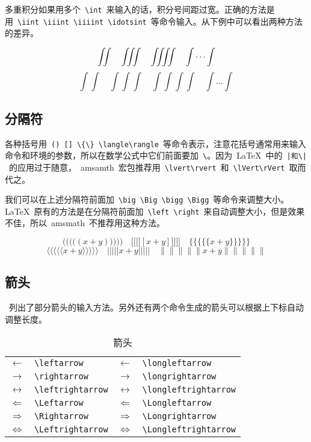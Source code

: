 多重积分如果用多个~\verb|\int|~来输入的话，积分号间距过宽。正确的方法是用~\verb|\iint \iiint \iiiint \idotsint|~等命令输入。从下例中可以看出两种方法的差异。

\begin{out}
\[\iint\quad \iiint\quad \iiiint\quad \idotsint\]
\[\int\int\quad \int\int\int\quad \int\int\int\int\quad \int\dots\int\]
\end{out}

\subsection{分隔符}
各种括号用~\verb|() [] \{\} \langle\rangle|~等命令表示，注意花括号通常用来输入命令和环境的参数，所以在数学公式中它们前面要加~\verb|\|。因为~\LaTeX~中的~\verb+|和\|+~的应用过于随意，~amsamth~宏包推荐用~\verb|\lvert\rvert|~和~\verb|\lVert\rVert|~取而代之。

我们可以在上述分隔符前面加~\verb|\big \Big \bigg \Bigg|~等命令来调整大小。\LaTeX~原有的方法是在分隔符前面加~\verb|\left \right|~来自动调整大小，但是效果不佳，所以~amsmath~不推荐用这种方法。

\begin{out}
\[\Bigg(\bigg(\Big(\big((x+y)\big)\Big)\bigg)\Bigg)\quad 
\Bigg[\bigg[\Big[\big[[x+y]\big]\Big]\bigg]\Bigg]\quad 
\Bigg\{\bigg\{\Big\{\big\{\{x+y\}\big\}\Big\}\bigg\}\Bigg\}\]
\[\Bigg\langle\bigg\langle\Big\langle\big\langle\langle x+y \rangle\big\rangle\Big\rangle\bigg\rangle\Bigg\rangle\quad
\Bigg\lvert\bigg\lvert\Big\lvert\big\lvert\lvert x+y \rvert\big\rvert\Big\rvert\bigg\rvert\Bigg\rvert\quad
\Bigg\lVert\bigg\lVert\Big\lVert\big\lVert\lVert x+y \rVert\big\rVert\Big\rVert\bigg\rVert\Bigg\rVert\]
\end{out}

\subsection{箭头}
~列出了部分箭头的输入方法。另外还有两个命令生成的箭头可以根据上下标自动调整长度。

\begin{table}[htbp]
\caption{箭头}
\label{tab:arrow}
\centering
\begin{tabular}{llll}
    \toprule
    $\leftarrow$       & \verb|\leftarrow|      & $\longleftarrow$       & \verb|\longleftarrow| \\
    $\rightarrow$      & \verb|\rightarrow|     & $\longrightarrow$      & \verb|\longrightarrow| \\
    $\leftrightarrow$  & \verb|\leftrightarrow| & $\longleftrightarrow$  & \verb|\longleftrightarrow| \\
    $\Leftarrow$       & \verb|\Leftarrow|      & $\Longleftarrow$       & \verb|\Longleftarrow| \\
    $\Rightarrow$      & \verb|\Rightarrow|     & $\Longrightarrow$      & \verb|\Longrightarrow| \\
    $\Leftrightarrow$  & \verb|\Leftrightarrow| & $\Longleftrightarrow$  & \verb|\Longleftrightarrow| \\
    \bottomrule
\end{tabular}
\end{table}

